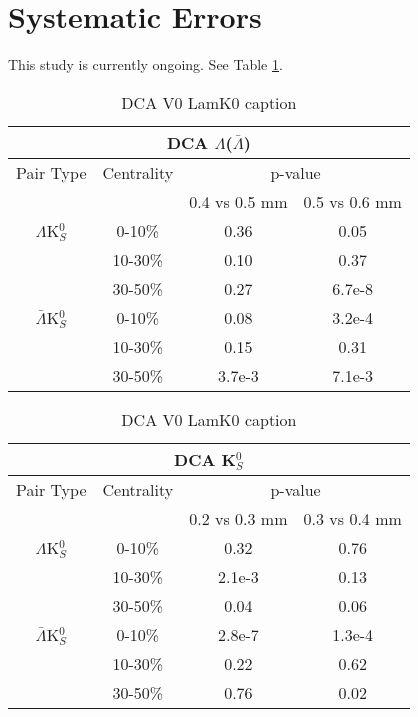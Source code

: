 \section{Systematic Errors}
\label{SystematicErrors}

This study is currently ongoing.  See Table \ref{tab:LamDcaLamK0}.

\begin{table}
 \centering
 \begin{tabular}{|c|c|c|c|}
  \multicolumn{4}{c}{DCA $\Lambda$($\bar{\Lambda}$)} \\
  \hline
  Pair Type & Centrality & \multicolumn{2}{c|}{p-value} \\
  \cline{3-4}
   & & 0.4 vs 0.5 mm & 0.5 vs 0.6 mm \\
  \hline
  $\Lambda$K$^{0}_{S}$ & 0-10\% & 0.36 & 0.05 \\
   & 10-30\% & 0.10 & 0.37 \\
   & 30-50\% & 0.27 & 6.7e-8 \\
  \hline
  $\bar{\Lambda}$K$^{0}_{S}$ & 0-10\% & 0.08 & 3.2e-4 \\
   & 10-30\% & 0.15 & 0.31 \\
   & 30-50\% & 3.7e-3 & 7.1e-3 \\
  \hline
 \end{tabular}
 \caption{DCA V0 LamK0 caption}
 \label{tab:LamDcaLamK0}
\end{table}

\begin{table}
 \centering
 \begin{tabular}{|c|c|c|c|}
  \multicolumn{4}{c}{DCA K$^{0}_{S}$} \\
  \hline
  Pair Type & Centrality & \multicolumn{2}{c|}{p-value} \\
  \cline{3-4}
   & & 0.2 vs 0.3 mm & 0.3 vs 0.4 mm \\
  \hline
  $\Lambda$K$^{0}_{S}$ & 0-10\% & 0.32 & 0.76 \\
   & 10-30\% & 2.1e-3 & 0.13 \\
   & 30-50\% & 0.04 & 0.06 \\
  \hline
  $\bar{\Lambda}$K$^{0}_{S}$ & 0-10\% & 2.8e-7 & 1.3e-4 \\
   & 10-30\% & 0.22 & 0.62 \\
   & 30-50\% & 0.76 & 0.02 \\
  \hline
 \end{tabular}
 \caption{DCA V0 LamK0 caption}
 \label{tab:K0DcaLamK0}
\end{table}

